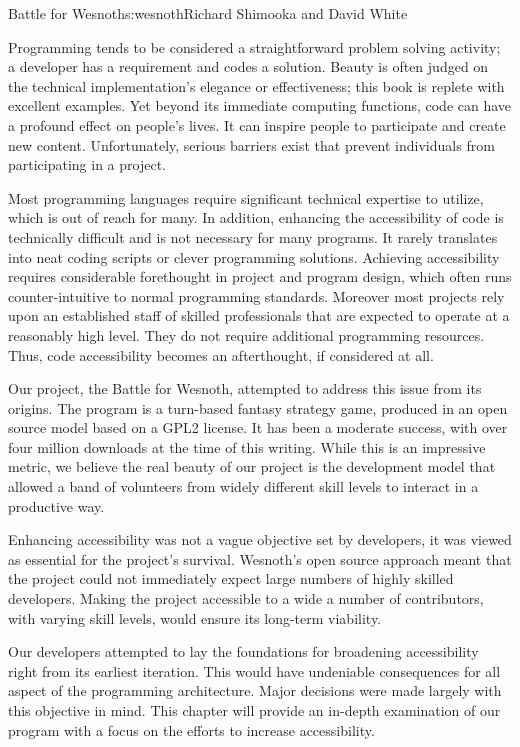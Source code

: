 \begin{aosachapter}{Battle for Wesnoth}{s:wesnoth}{Richard Shimooka and David White}

Programming tends to be considered a straightforward problem solving
activity; a developer has a requirement and codes a solution. Beauty
is often judged on the technical implementation's elegance or
effectiveness; this book is replete with excellent examples. Yet
beyond its immediate computing functions, code can have a profound
effect on people's lives. It can inspire people to participate and
create new content. Unfortunately, serious barriers exist that prevent
individuals from participating in a project.

Most programming languages require significant technical expertise to
utilize, which is out of reach for many. In addition, enhancing the
accessibility of code is technically difficult and is not necessary
for many programs. It rarely translates into neat coding scripts or
clever programming solutions. Achieving accessibility requires
considerable forethought in project and program design, which often
runs counter-intuitive to normal programming standards. Moreover most
projects rely upon an established staff of skilled professionals that
are expected to operate at a reasonably high level. They do not
require additional programming resources. Thus, code accessibility
becomes an afterthought, if considered at all.

Our project, the Battle for Wesnoth, attempted to address this issue
from its origins. The program is a turn-based fantasy strategy game,
produced in an open source model based on a GPL2 license. It has been
a moderate success, with over four million downloads at the time of
this writing. While this is an impressive metric, we believe the real
beauty of our project is the development model that allowed a band of
volunteers from widely different skill levels to interact in a
productive way.

Enhancing accessibility was not a vague objective set by developers,
it was viewed as essential for the project's survival. Wesnoth's open
source approach meant that the project could not immediately expect
large numbers of highly skilled developers.  Making the project
accessible to a wide a number of contributors, with varying skill
levels, would ensure its long-term viability.

Our developers attempted to lay the foundations for broadening
accessibility right from its earliest iteration. This would have
undeniable consequences for all aspect of the programming
architecture. Major decisions were made largely with this objective in
mind. This chapter will provide an in-depth examination of our program
with a focus on the efforts to increase accessibility.


\end{aosachapter}

